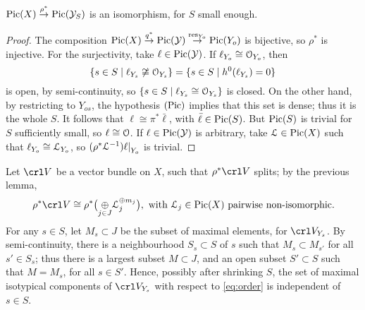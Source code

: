 \documentclass[11pt,reqno]{amsart}
\let\euf\EuScript
\let\cal\mathcal
\let\srel\stackrel
\numberwithin{equation}{section}
\numberwithin{figure}{section}
\begin{document}
\begin{m-lemma}\label{lm:rho}
${\mathop{\rm Pic}\nolimits}(X)\srel{\rho^*}{\to}{\mathop{\rm Pic}\nolimits}({{\cal Y}}_{S})$ is an isomorphism, for $S$ small enough. 
\end{m-lemma}

\begin{proof}
The composition ${\mathop{\rm Pic}\nolimits}(X)\srel{q^*}{\to}{\mathop{\rm Pic}\nolimits}({{\cal Y}})\srel{{{\rm res}}_{Y_o}}{\to}{\mathop{\rm Pic}\nolimits}(Y_o)$ 
is bijective, so $\rho^*$ is injective. 
For the surjectivity, take $\ell\in{\mathop{\rm Pic}\nolimits}({{\cal Y}})$. If $\ell_{Y_o}\cong{{\euf O}}_{Y_o}$, then 
$$
\{s\in S\mid \ell_{Y_s}\not\cong{{\euf O}}_{Y_s}\}=\{s\in S\mid h^0(\ell_{Y_s})=0\}
$$
is open, by semi-continuity, so $\{s\in S\mid\ell_{Y_s}\cong{{\euf O}}_{Y_s}\}$ is closed. 
On the other hand, by restricting to $Y_{os}$, the hypothesis $({\mathop{\rm Pic}\nolimits})$ implies that this 
set is dense; thus it is the whole $S$. 
It follows that $\ell\cong\pi^*\bar\ell$, with $\bar\ell\in{\mathop{\rm Pic}\nolimits}(S)$. 
But ${\mathop{\rm Pic}\nolimits}(S)$ is trivial for $S$ sufficiently small, so $\ell\cong{{\euf O}}$. 
If $\ell\in{\mathop{\rm Pic}\nolimits}({{\cal Y}})$ is arbitrary, take ${{\euf L}}\in{\mathop{\rm Pic}\nolimits}(X)$ such that 
$\ell_{Y_o}\cong{{\euf L}}_{Y_o}$, so ${(\rho^*{{\euf L}}^{-1})\ell|}_{Y_o}$ is trivial. 
\end{proof}

Let $\crl V$ be a vector bundle on $X$, such that $\rho^*\crl V$ splits; 
by the previous lemma, 
\begin{equation}\label{eq:VL}
{\rho^*\crl V}\cong\rho^*\bigl(\underset{j\in J}{\oplus}{{\euf L}}_j^{\oplus m_j}\bigr),
\text{ with ${{\euf L}}_j\in{\mathop{\rm Pic}\nolimits}(X)$ pairwise non-isomorphic.}
\end{equation}
For any $s\in S$, let $M_s\subset J$ be the subset of maximal elements, 
for $\crl V_{Y_s}$. 
By semi-continuity, there is a neighbourhood $S_s\subset S$ of $s$ such that 
$M_s\subset M_{s'}$ for all $s'\in S_s$; thus there is a largest subset $M\subset J$, 
and an open subset $S'\subset S$ such that $M=M_s$, for all $s\in S'$. 
Hence, possibly after shrinking $S$, the set of maximal isotypical components of 
$\crl V_{Y_s}$ with respect to \eqref{eq:order} is independent of $s\in S$. 
\end{document}
